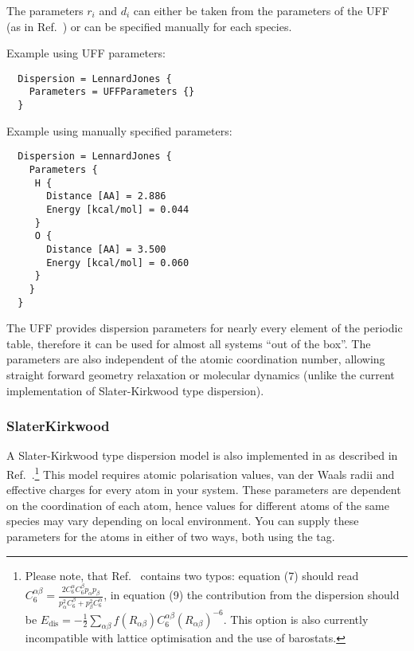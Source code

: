The parameters $r_i$ and $d_i$ can either be taken from the parameters
of the UFF~\cite{rappe-JACS-114-10024} (as in
Ref.~\cite{zhechkov-JCTC-1-841}) or can be specified manually for each
species.

Example using UFF parameters:\invparskip
\begin{verbatim}
  Dispersion = LennardJones {
    Parameters = UFFParameters {}
  }
\end{verbatim}

Example using manually specified parameters:\invparskip
\begin{verbatim}
  Dispersion = LennardJones {
    Parameters {
     H {
       Distance [AA] = 2.886
       Energy [kcal/mol] = 0.044
     }
     O {
       Distance [AA] = 3.500
       Energy [kcal/mol] = 0.060
     }
    }
  }
\end{verbatim}

The UFF provides dispersion parameters for nearly every element of the
periodic table, therefore it can be used for almost all systems
``out of the box''. The parameters are also independent of the atomic
coordination number, allowing straight forward geometry relaxation or
molecular dynamics (unlike the current implementation of
Slater-Kirkwood type dispersion).


\subsubsection{SlaterKirkwood}
\label{sec:dftbp.SlaterKirkwood}
\label{sec:SlaterKirkwood}

A Slater-Kirkwood type dispersion model is also implemented in
\dftbp{} as described in
Ref.~\cite{elstner-jcp-114-5149}.\footnote{Please note, that
  Ref.~\cite{elstner-jcp-114-5149} contains two typos: equation (7)
  should read $C_6^{\alpha\beta} = \frac{2 C_6^\alpha C_6^\beta
    p_\alpha p_\beta}{p_\alpha^2 C_6^\beta + p_\beta^2 C_6^\alpha}$,
  in equation (9) the contribution from the dispersion should be
  $E_{\text{dis}} = -\frac{1}{2} \sum_{\alpha\beta}
  f(R_{\alpha\beta})C_6^{\alpha\beta}(R_{\alpha\beta})^{-6}$. This
  option is also currently incompatible with lattice optimisation and
  the use of barostats.}  This model requires atomic polarisation
values, van der Waals radii and effective charges for every atom in
your system. These parameters are dependent on the coordination of
each atom, hence values for different atoms of the same species may
vary depending on local environment.  You can supply these parameters
for the atoms in either of two ways, both using the
 tag.

